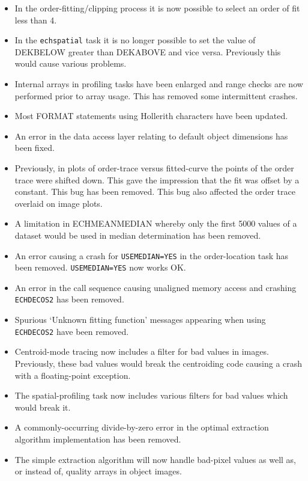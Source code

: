 \documentclass[twoside,11pt]{article}
\newcommand{\htmlref}[2]{#1}
\renewcommand{\_}{\texttt{\symbol{95}}}
\begin{document}
\begin{itemize}
\item In the order-fitting/clipping process it is now possible to
   select an order of fit less than 4.
\item In the {\tt ech\_spatial} task it is no longer possible to set the
   value of DEK\_BELOW greater than DEK\_ABOVE and vice versa.
   Previously this would cause various problems.
\item Internal arrays in profiling tasks have been enlarged and
   range checks are now performed prior to array usage.  This
   has removed some intermittent crashes.
\item Most FORMAT statements using Hollerith characters have been updated.
\item An error in the data access layer relating to default object
   dimensions has been fixed.
\item Previously, in plots of order-trace versus fitted-curve the points
   of the order trace were shifted down.  This gave the impression that
   the fit was offset by a constant.  This bug has been removed.
   This bug also affected the order trace overlaid on image plots.
\item A limitation in ECH\_MEAN\_MEDIAN whereby only the first 5000 values of
   a dataset would be used in median determination has been removed.
\item An error causing a crash for
   \htmlref{{\tt{USE\_MEDIAN=YES}}}{par_USE_MEDIAN} in the order-location
   task has been removed.  {\tt USE\_MEDIAN=YES} now works OK.
\item An error in the call sequence causing unaligned memory access and
   crashing {\tt ECH\_DECOS2} has been removed.
\item Spurious `Unknown fitting function' messages appearing when using
   {\tt ECH\_DECOS2} have been removed.
\item Centroid-mode tracing now includes a filter for bad values in images.
   Previously, these bad values would break the centroiding code causing
   a crash with a floating-point exception.
\item The spatial-profiling task now includes various filters for bad
   values which would break it.
\item A commonly-occurring divide-by-zero error in the optimal extraction
   algorithm implementation has been removed.
\item The simple extraction algorithm will now handle bad-pixel values as
   well as, or instead of, quality arrays in object images.

\end{itemize}
\end{document}

